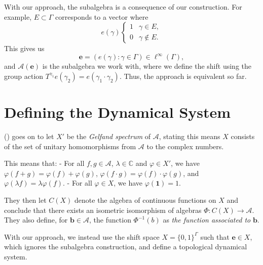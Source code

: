 \documentclass[
  british,
]{article}
\theoremstyle{plain}
\theoremstyle{remark}
\newcommand{\AmenableGroup}{{\Gamma}}
\newcommand{\AmenableGroupElement}{{\gamma}}
\newcommand{\GroupAction}[2]{T^{#1}{#2}}
\newcommand{\GroupOperation}[2]{{#1}\cdot{#2}}
\newcommand{\ShiftSpace}{{X}}
\begin{document}
With our approach, the subalgebra is a consequence of our construction.
For example, \(E\subset\AmenableGroup\) corresponds to a vector where
\[e(\AmenableGroupElement)\begin{cases}1&\AmenableGroupElement\in E,\\0&\AmenableGroupElement\notin E. \end{cases} \]
This gives us
\[\boldsymbol{e}=(e(\AmenableGroupElement):\AmenableGroupElement\in\AmenableGroup)\in\ell^\infty(\AmenableGroup),\]
and \(\mathcal{A}(\boldsymbol{e})\) is the subalgebra we work with,
where we define the shift using the group action
\(\GroupAction{\AmenableGroupElement_1}{e(\AmenableGroupElement_2)}=e(\GroupOperation{\AmenableGroupElement_1}{\AmenableGroupElement_2})\).
Thus, the approach is equivalent so far.

\section{Defining the Dynamical
System}\label{defining-the-dynamical-system}

() goes on
to let \(X'\) be the \emph{Gelfand spectrum} of \(\mathcal{A}\), stating
this means \(X\) consists of the set of unitary homomorphisms from
\(\mathcal{A}\) to the complex numbers.

This means that: - For all \(f,g\in\mathcal{A}\),
\(\lambda\in\mathbb{C}\) and \(\varphi\in X'\), we have
\(\varphi(f+g)=\varphi(f)+\varphi(g)\),
\(\varphi(f\cdot g)=\varphi(f)\cdot \varphi(g)\), and
\(\varphi(\lambda f)=\lambda\varphi(f)\). - For all \(\varphi\in X\), we
have \(\varphi(\boldsymbol{1})=1\).

They then let \(C(X)\) denote the algebra of continuous functions on
\(X\) and conclude that there exists an isometric isomorphism of
algebras \(\Phi:C(X)\rightarrow\mathcal{A}\). They also define, for
\(\boldsymbol{b}\in\mathcal{A}\), the function \(\Phi^{-1}(b)\) as
\emph{the function associated to} \(\boldsymbol{b}\).

With our approach, we instead use the shift space
\(\ShiftSpace=\{0,1\}^\AmenableGroup\) such that
\(\boldsymbol{e}\in\ShiftSpace\), which ignores the subalgebra
construction, and define a topological dynamical system.
\end{document}
